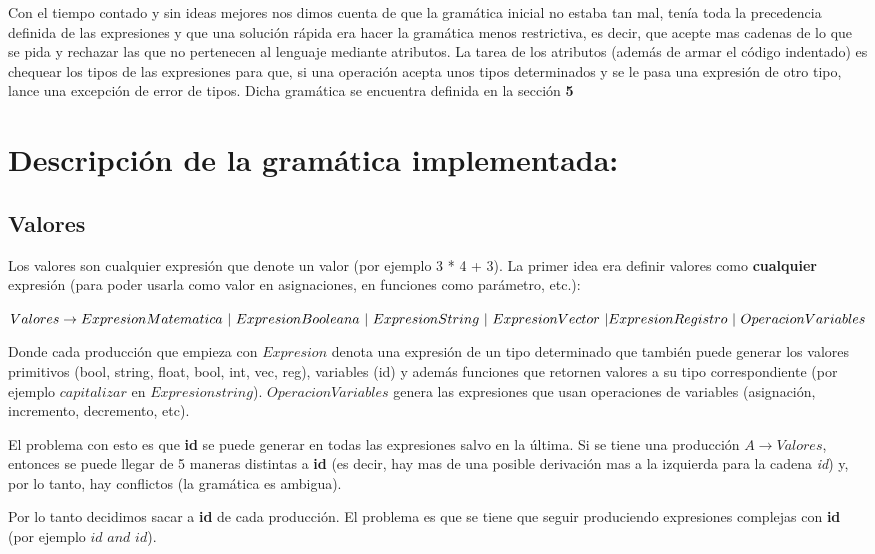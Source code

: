 Con el tiempo contado y sin ideas mejores nos dimos cuenta de que la gramática inicial no estaba tan mal, tenía toda la precedencia definida de las expresiones y que una solución rápida era hacer la gramática menos restrictiva, es decir, que acepte mas cadenas de lo que se pida y rechazar las que no pertenecen al lenguaje mediante atributos. La tarea de los atributos (además de armar el código indentado) es chequear los tipos de las expresiones para que, si una operación acepta unos tipos determinados y se le pasa una expresión de otro tipo, lance una excepción de error de tipos. Dicha gramática se encuentra definida en la sección \textbf{5}

\section{Descripción de la gramática implementada:}

\subsection{Valores}
Los valores son cualquier expresión que denote un valor (por ejemplo 3 * 4 + 3). La primer idea era definir valores como \textbf{cualquier} expresión (para poder usarla como valor en asignaciones, en funciones como parámetro, etc.):

$Valores \rightarrow ExpresionMatematica \  | \  ExpresionBooleana \  | \ ExpresionString  \ | \ ExpresionVector \ | \ \\ ExpresionRegistro \ | \ OperacionVariables $

Donde cada producción que empieza con $Expresion$ denota una expresión de un tipo determinado que también puede generar los valores primitivos (bool, string, float, bool, int, vec, reg), variables (id) y además funciones que retornen valores a su tipo correspondiente (por ejemplo $capitalizar$ en $Expresionstring$). $OperacionVariables$ genera las expresiones que usan operaciones de variables (asignación, incremento, decremento, etc). 

El problema con esto es que \textbf{id} se puede generar en todas las expresiones salvo en la última. Si se tiene una producción $A \rightarrow Valores$, entonces se puede llegar de 5 maneras distintas a \textbf{id} (es decir, hay mas de una posible derivación mas a la izquierda para la cadena \textit{id}) y, por lo tanto, hay conflictos (la gramática es ambigua). 

Por lo tanto decidimos sacar a \textbf{id} de cada producción. El problema es que se tiene que seguir produciendo expresiones complejas con \textbf{id} (por ejemplo $id$ $and$ $id$).


